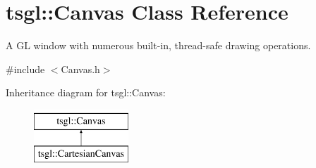 \hypertarget{classtsgl_1_1_canvas}{}\section{tsgl\+:\+:Canvas Class Reference}
\label{classtsgl_1_1_canvas}


A G\+L window with numerous built-\/in, thread-\/safe drawing operations.  




{\ttfamily \#include $<$Canvas.\+h$>$}

Inheritance diagram for tsgl\+:\+:Canvas\+:\begin{figure}[H]
\begin{center}
\leavevmode
\includegraphics[height=2.000000cm]{classtsgl_1_1_canvas}
\end{center}
\end{figure}
